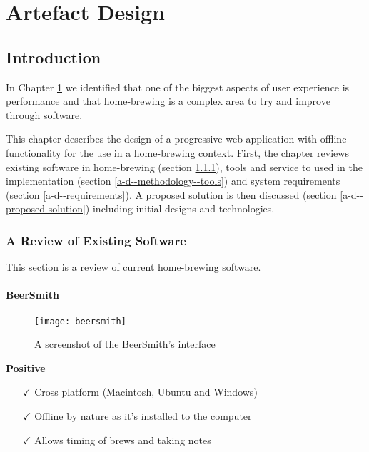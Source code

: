 \chapter{Artefact Design} \label{a-d}

\section{Introduction} \label{a-d--introduction}

In Chapter \ref{a-d} we identified that one of the biggest aspects of user experience is performance and that home-brewing is a complex area to try and improve through software.

This chapter describes the design of a progressive web application with offline functionality for the use in a home-brewing context. First, the chapter reviews existing software in home-brewing (section \ref{a-d--review-of-existing-software}), tools and service to used in the implementation (section \ref{a-d--methodology--tools}) and system requirements (section \ref{a-d--requirements}). A proposed solution is then discussed (section \ref{a-d--proposed-solution}) including initial designs and technologies.

\subsection{A Review of Existing Software} \label{a-d--review-of-existing-software}

This section is a review of current home-brewing software.

\subsubsection{BeerSmith}

\begin{figure}[H]
  \centering
    \texttt{[image: beersmith]}
  \caption{A screenshot of the BeerSmith's interface}
  \label{figure-maltio}
\end{figure}

\noindent\textbf{Positive}

\begin{itemize}
  \item[$\checkmark$] Cross platform (Macintosh, Ubuntu and Windows)
  \item[$\checkmark$] Offline by nature as it's installed to the computer
  \item[$\checkmark$] Allows timing of brews and taking notes
\end{itemize}

